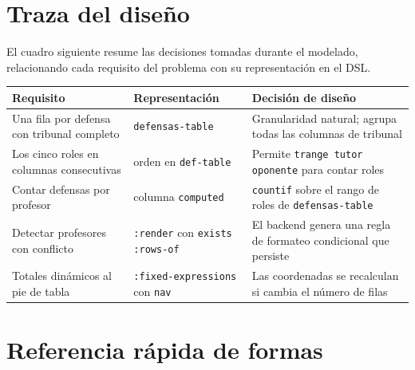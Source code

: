 \documentclass[12pt,a4paper]{report}
\begin{document}
\medskip


\section{Traza del diseño}
\label{sec:traza}

El cuadro siguiente resume las decisiones tomadas durante el modelado,
relacionando cada requisito del problema con su representación en el DSL.

\begin{center}
\renewcommand{\arraystretch}{1.3}
\begin{tabular}{p{4.2cm}p{3.2cm}p{5.2cm}}
\toprule
\textbf{Requisito} & \textbf{Representación} & \textbf{Decisión de diseño} \\
\midrule
Una fila por defensa con tribunal completo
  & \texttt{defensas-table}
  & Granularidad natural; agrupa todas las columnas de tribunal \\
Los cinco roles en columnas consecutivas
  & orden en \texttt{def-table}
  & Permite \texttt{trange tutor oponente} para contar roles \\
Contar defensas por profesor
  & columna \texttt{computed}
  & \texttt{countif} sobre el rango de roles de \texttt{defensas-table} \\
Detectar profesores con conflicto
  & \texttt{:render} con \texttt{exists :rows-of}
  & El backend genera una regla de formateo condicional que persiste \\
Totales dinámicos al pie de tabla
  & \texttt{:fixed-expressions} con \texttt{nav}
  & Las coordenadas se recalculan si cambia el número de filas \\
\bottomrule
\end{tabular}
\end{center}

\section{Referencia rápida de formas}
\label{sec:referencia}
\end{document}
